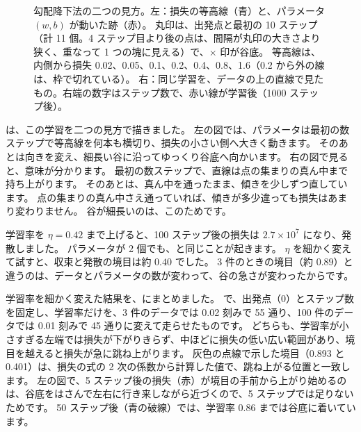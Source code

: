 \begin{figure}[tbp]
\caption{勾配降下法の二つの見方。左：損失の等高線（青）と、パラメータ $(w,b)$ が動いた跡（赤）。
丸印は、出発点と最初の 10 ステップ（計 11 個。4 ステップ目より後の点は、間隔が丸印の大きさより狭く、重なって 1 つの塊に見える）で、$\times$ 印が谷底。
等高線は、内側から損失 0.02、0.05、0.1、0.2、0.4、0.8、1.6（0.2 から外の線は、枠で切れている）。
右：同じ学習を、データの上の直線で見たもの。右端の数字はステップ数で、赤い線が学習後（1000 ステップ後）。}
\label{fig:ml-landscape}
\end{figure}

は、この学習を二つの見方で描きました。
左の図では、パラメータは最初の数ステップで等高線を何本も横切り、損失の小さい側へ大きく動きます。
そのあとは向きを変え、細長い谷に沿ってゆっくり谷底へ向かいます。
右の図で見ると、意味が分かります。
最初の数ステップで、直線は点の集まりの真ん中まで持ち上がります。
そのあとは、真ん中を通ったまま、傾きを少しずつ直しています。
点の集まりの真ん中さえ通っていれば、傾きが多少違っても損失はあまり変わりません。
谷が細長いのは、このためです。

学習率を $\eta=0.42$ まで上げると、100 ステップ後の損失は $2.7\times 10^{7}$ になり、発散しました。
パラメータが 2 個でも、と同じことが起きます。
$\eta$ を細かく変えて試すと、収束と発散の境目は約 $0.40$ でした。
3 件のときの境目（約 $0.89$）と違うのは、データとパラメータの数が変わって、谷の急さが変わったからです。

学習率を細かく変えた結果を、にまとめました。
 で、出発点（0）とステップ数を固定し、学習率だけを、3 件のデータでは 0.02 刻みで 55 通り、100 件のデータでは 0.01 刻みで 45 通りに変えて走らせたものです。
どちらも、学習率が小さすぎる左端では損失が下がりきらず、中ほどに損失の低い広い範囲があり、境目を越えると損失が急に跳ね上がります。
灰色の点線で示した境目（0.893 と 0.401）は、損失の式の 2 次の係数から計算した値で、跳ね上がる位置と一致します。
左の図で、5 ステップ後の損失（赤）が境目の手前から上がり始めるのは、谷底をはさんで左右に行き来しながら近づくので、5 ステップでは足りないためです。
50 ステップ後（青の破線）では、学習率 0.86 までは谷底に着いています。

